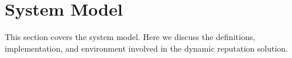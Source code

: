 \section{System Model}
\label{sec:system_model}
This section covers the system model. Here we discuss the definitions, implementation, and environment involved in the dynamic reputation solution.


% 





% 